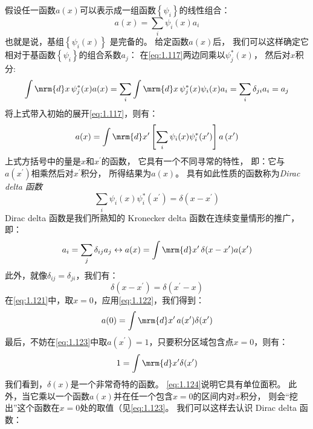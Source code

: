 假设任一函数$a(x)$可以表示成一组函数$\left\{\psi_i\right\}$的线性组合：
\begin{equation}
 a(x) = \sum_i \psi_i(x)a_i
 \label{eq:1.117}
\end{equation}
也就是说，基组$\left\{\psi_i(x)\right\}$ 是完备的。
给定函数$a(x)$后，
我们可以这样确定它相对于基函数$\left\{\psi_i\right\}$的组合系数$a_j$：
在\autoref{eq:1.117}两边同乘以$\psi_j^\ast(x)$，
然后对$x$积分:
\begin{equation}
 \int \mrm{d}x\,\psi_j^\ast(x)a(x) = \sum_i \int \mrm{d}x\,\psi_j^\ast(x)\psi_i(x)a_i = \sum_i \delta_{ji}a_i = a_j
 \label{eq:1.118}
\end{equation}
将上式带入初始的展开\autoref{eq:1.117}，则有：
\begin{equation}
 a(x) = \int \mrm{d}x^\prime\left[\sum_i\psi_i(x)\psi_i^\ast(x^\prime)\right]a\left(x^\prime\right)
 \label{eq:1.119}
\end{equation}
上式方括号中的量是$x$和$x^\prime$的函数，
它具有一个不同寻常的特性，
即：它与$a(x^\prime)$相乘然后对$x^\prime$积分，
所得结果为$a(x)$。
具有如此性质的函数称为\emph{Dirac delta 函数}
\begin{equation}
 \sum_i \psi_i(x)\psi_i^\ast(x^\prime) = \delta(x-x^\prime)
 \label{eq:1.120}
\end{equation}
Dirac delta 函数是我们所熟知的 Kronecker delta 函数在连续变量情形的推广，即：
\begin{equation}
 a_i = \sum_j\delta_{ij}a_j \leftrightarrow a(x) = \int\mrm{d}x^\prime\,\delta(x-x^\prime)a(x^\prime)
 \label{eq:1.121}
\end{equation}
此外，就像$\delta_{ij} = \delta_{ji}$，我们有：
\begin{equation}
 \delta(x-x^\prime) = \delta(x^\prime -x)
 \label{eq:1.122}
\end{equation}
在\autoref{eq:1.121}中，取$x=0$，应用\autoref{eq:1.122}，我们得到：
\begin{equation}
 a(0) = \int \mrm{d}x^\prime\,a(x^\prime)\delta(x^\prime)
 \label{eq:1.123}
\end{equation}
最后，不妨在\autoref{eq:1.123}中取$a(x^\prime)=1$，只要积分区域包含点$x=0$，则有：
\begin{equation}
 1 = \int \mrm{d}x^\prime \delta(x^\prime)
 \label{eq:1.124}
\end{equation}
我们看到，$\delta(x)$是一个非常奇特的函数。
\autoref{eq:1.124}说明它具有单位面积。
此外，当它乘以一个函数$a(x)$并在任一个包含$x=0$的区间内对$x$积分，
则会``挖出''这个函数在$x=0$处的取值（见\autoref{eq:1.123}。
我们可以这样去认识 Dirac delta 函数：
